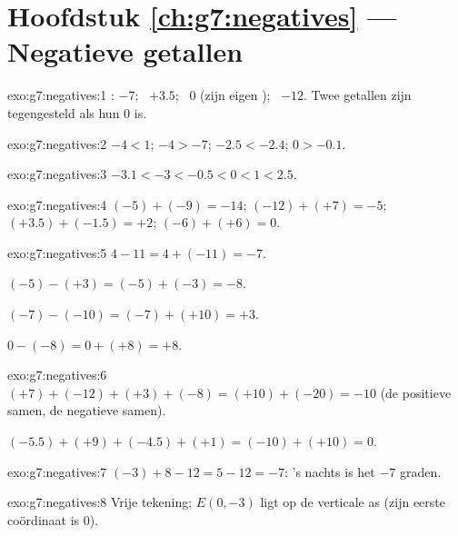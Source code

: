\section*{Hoofdstuk \ref{ch:g7:negatives} --- Negatieve getallen}

\begin{solution}{exo:g7:negatives:1}
: $-7$; \ $+3.5$; \ $0$ (zijn eigen ); \ $-12$. Twee
getallen zijn tegengesteld als hun  $0$ is.
\end{solution}

\begin{solution}{exo:g7:negatives:2}
$-4 < 1$; \quad $-4 > -7$; \quad $-2.5 < -2.4$; \quad $0 > -0.1$.
\end{solution}

\begin{solution}{exo:g7:negatives:3}
$-3.1 < -3 < -0.5 < 0 < 1 < 2.5$.
\end{solution}

\begin{solution}{exo:g7:negatives:4}
$(-5) + (-9) = -14$; \quad
$(-12) + (+7) = -5$; \quad
$(+3.5) + (-1.5) = +2$; \quad
$(-6) + (+6) = 0$.
\end{solution}

\begin{solution}{exo:g7:negatives:5}
$4 - 11 = 4 + (-11) = -7$.

$(-5) - (+3) = (-5) + (-3) = -8$.

$(-7) - (-10) = (-7) + (+10) = +3$.

$0 - (-8) = 0 + (+8) = +8$.
\end{solution}

\begin{solution}{exo:g7:negatives:6}
$(+7) + (-12) + (+3) + (-8) = (+10) + (-20) = -10$ (de positieve samen, de
negatieve samen).

$(-5.5) + (+9) + (-4.5) + (+1) = (-10) + (+10) = 0$.
\end{solution}

\begin{solution}{exo:g7:negatives:7}
$(-3) + 8 - 12 = 5 - 12 = -7$: 's nachts is het $-7$ graden.
\end{solution}

\begin{solution}{exo:g7:negatives:8}
Vrije tekening; $E(0, -3)$ ligt op de verticale as (zijn eerste coördinaat is
$0$).
\end{solution}


